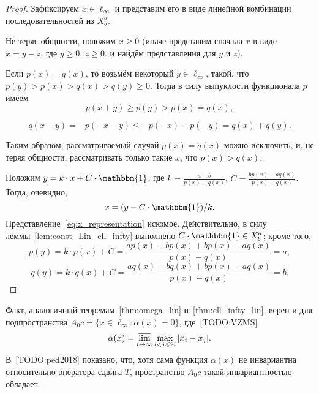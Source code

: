 \documentclass[a4paper,14pt]{article} %
\theoremstyle{plain}
\theoremstyle{definition}
\begin{document}
\begin{proof}
	Зафиксируем $x \in \ell_\infty$ и представим его в виде линейной комбинации последовательностей из $X^a_b$.

	Не теряя общности, положим $x\geq 0$
	(иначе представим сначала $x$ в виде $x = y - z$, где $y \geq 0$, $z \geq 0$.
	и найдём представления для $y$ и $z$).

	Если $p(x) = q(x)$, то возьмём некоторый $y\in\ell_\infty$,
	такой, что $p(y) > p(x) > q(x)  > q(y) \geq 0$.
	Тогда в силу выпуклости функционала $p$ имеем
	\begin{equation}
		p(x+y) \geq p(y) > p(x) = q(x)
		,
	\end{equation}


	\begin{equation}
		q(x+y) = -p(-x-y) \leq -p(-x) -p(-y) = q(x) + q(y)
		.
	\end{equation}

	Таким образом, рассматриваемый случай $p(x) = q(x)$ можно исключить,
	и, не теряя общности, рассматривать только такие $x$, что $p(x) > q(x)$.

	Положим $y=k\cdot x + C\cdot\mathbbm{1}$,
	где $k=\frac{a-b}{p(x)-q(x)}$, $C=\frac{bp(x)-aq(x)}{p(x)-q(x)}$.
	Тогда, очевидно,
	\begin{equation}
		\label{eq:x_representation}
		x=(y-C\cdot\mathbbm{1})/k
		.
	\end{equation}
	Представление~\eqref{eq:x_representation} искомое.
	Действительно, в силу леммы~\ref{lem:const_Lin_ell_infty} выполнено
	$C\cdot\mathbbm{1}\in X^a_b$; кроме того,
	\begin{equation}
		p(y) = k\cdot p(x) + C
		=
		\frac{ap(x)-bp(x)+bp(x)-aq(x)}{p(x)-q(x)}
		=
		a
		,
	\end{equation}
	\begin{equation}
		q(y) = k\cdot q(x) + C
		=
		\frac{aq(x)-bq(x)+bp(x)-aq(x)}{p(x)-q(x)}
		=
		b
		.
	\end{equation}
\end{proof}

Факт, аналогичный теоремам~\ref{thm:omega_lin} и~\ref{thm:ell_infty_lin}, верен и для подпространства
$A_0 c = \{ x \in \ell_\infty : \alpha(x) =0 \}$,
где~[TODO:VZMS]
\begin{equation*}
	\alpha(x) = \varlimsup_{i\to\infty} \max_{i<j\leqslant 2i} |x_i - x_j|
	.
\end{equation*}
В~[TODO:ped2018] показано, что, хотя сама функция $\alpha(x)$ не инвариантна относительно оператора сдвига $T$,
пространство $A_0 c$ такой инвариантностью обладает.
\end{document}
